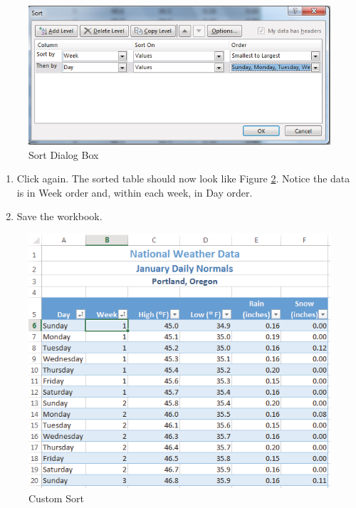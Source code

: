 \begin{figure}[H]
	\centering
	\includegraphics[width=\maxwidth{.95\linewidth}]{gfx/ch05_fig14}
	\caption{Sort Dialog Box}
	\label{05:fig14}
\end{figure}

\begin{enumerate}
	\item Click  again. The sorted table should now look like Figure \ref{05:fig15}. Notice the data is in Week order and, within each week, in Day order.
\item Save the workbook.
\end{enumerate}

\begin{figure}[H]
	\centering
	\includegraphics[width=\maxwidth{.95\linewidth}]{gfx/ch05_fig15}
	\caption{Custom Sort}
	\label{05:fig15}
\end{figure}

